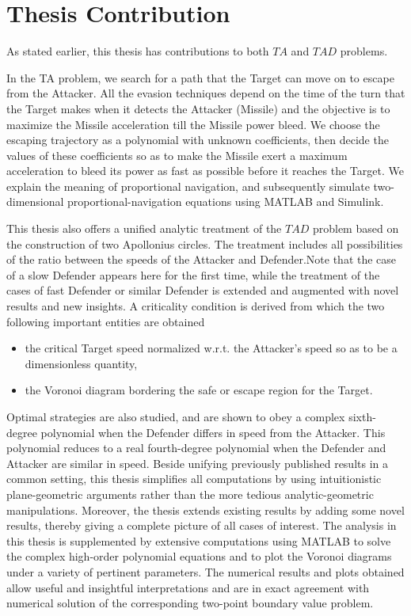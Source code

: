 \section{Thesis Contribution}
As stated earlier, this thesis has contributions to both $ TA $ and $ TAD $ problems.

In the TA problem, we search for a path that the Target can move on to escape from the Attacker. All the evasion techniques depend on the time of the turn that the Target makes when it detects the Attacker (Missile) and the objective is to maximize the Missile acceleration till the Missile power bleed. We choose the escaping trajectory as a polynomial with unknown coefficients, then decide the values of these coefficients so as to make the Missile exert a maximum acceleration to bleed its power as fast as possible before it reaches the Target. We explain the meaning of proportional navigation, and subsequently simulate two- dimensional proportional-navigation equations using MATLAB and Simulink.

This thesis also offers a unified analytic treatment of the $TAD$ problem based on the construction of two Apollonius circles.
The treatment includes all possibilities of the ratio between the speeds of the Attacker and Defender.Note that the case of a slow Defender appears here for the first time, while the treatment of the cases of fast Defender or similar Defender is extended and augmented with novel results and new insights. A criticality condition is derived from which the two following important entities are obtained
\begin{itemize}
\item the critical Target speed normalized w.r.t. the Attacker's speed so as to be a dimensionless quantity,
\item the Voronoi diagram bordering the safe or escape region for the Target.
\end{itemize}

Optimal strategies are also studied, and are shown to obey a complex sixth-degree polynomial when the Defender differs in speed from the Attacker. This polynomial reduces to a real fourth-degree polynomial when the Defender and Attacker are similar in speed.
Beside unifying previously published results in a common setting, this thesis simplifies all computations by using intuitionistic plane-geometric arguments rather than the more tedious analytic-geometric manipulations. 
Moreover, the thesis extends existing results by adding some novel results, thereby giving a complete picture of all cases of interest.
The analysis in this thesis is supplemented by extensive computations using MATLAB to solve the complex high-order polynomial equations and to plot the Voronoi diagrams under a variety of pertinent parameters. The numerical results and plots obtained allow useful and insightful interpretations and are in exact agreement with numerical solution of the corresponding two-point boundary value problem.

